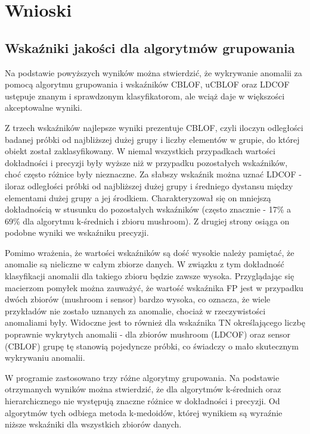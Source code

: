\documentclass[11pt,a4paper,twoside]{article}
\begin{document}
\newpage
\section{Wnioski}

\subsection{Wskaźniki jakości dla algorytmów grupowania}

Na podstawie powyższych wyników można stwierdzić, że wykrywanie anomalii za pomocą algorytmu grupowania i wskaźników CBLOF, uCBLOF oraz LDCOF ustępuje znanym i sprawdzonym klasyfikatorom, ale wciąż daje w większości akceptowalne wyniki. 

Z trzech wskaźników najlepsze wyniki prezentuje CBLOF, czyli iloczyn odległości badanej próbki od najbliższej dużej grupy i liczby elementów w grupie, do której obiekt został zaklasyfikowany. W niemal wszystkich przypadkach wartości dokładności i precyzji były wyższe niż w przypadku pozostałych wskaźników, choć często różnice były nieznaczne. Za słabszy wskaźnik można uznać LDCOF - iloraz odległości próbki od najbliższej dużej grupy i średniego dystansu między elementami dużej grupy a jej środkiem. Charakteryzował się on mniejszą dokładnością w stusunku do pozostałych wskaźników (często znacznie - 17\% a 69\% dla algorytmu k-średnich i zbioru mushroom). Z drugiej strony osiąga on podobne wyniki we wskaźniku precyzji.

Pomimo wrażenia, że wartości wskaźników są dość wysokie należy pamiętać, że anomalie są nieliczne w całym zbiorze danych. W związku z tym dokładność klasyfikacji anomalii dla takiego zbioru będzie zawsze wysoka. Przyglądając się macierzom pomyłek można zauważyć, że wartość wskaźnika FP jest w przypadku dwóch zbiorów (mushroom i sensor) bardzo wysoka, co oznacza, że wiele przykładów nie zostało uznanych za anomalie, chociaż w rzeczywistości anomaliami były. Widoczne jest to również dla wskaźnika TN określającego liczbę poprawnie wykrytych anomalii - dla zbiorów mushroom (LDCOF) oraz sensor (CBLOF) grupę tę stanowią pojedyncze próbki, co świadczy o mało skutecznym wykrywaniu anomalii.

W programie zastosowano trzy różne algorytmy grupowania. Na podstawie otrzymanych wyników można stwierdzić, że dla algorytmów k-średnich oraz hierarchicznego nie występują znaczne różnice w dokładności i precyzji. Od algorytmów tych odbiega metoda k-medoidów, której wynikiem są wyraźnie niższe wskaźniki dla wszystkich zbiorów danych.
\end{document}
